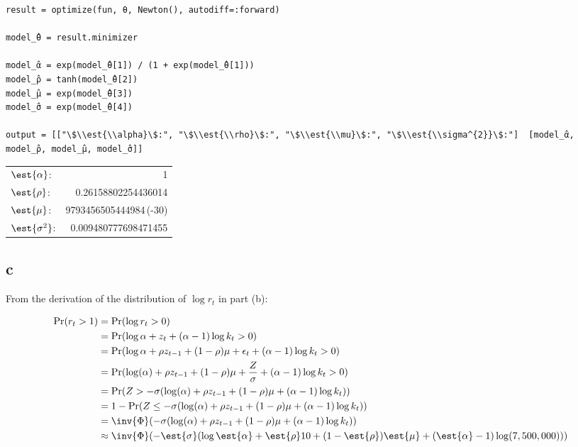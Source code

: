 \documentclass[12pt, letterpaper]{paper}
\begin{document}
\begin{verbatim}
result = optimize(fun, θ, Newton(), autodiff=:forward)

model_̂θ = result.minimizer

model_̂α = exp(model_̂θ[1]) / (1 + exp(model_̂θ[1]))
model_̂ρ = tanh(model_̂θ[2])
model_̂μ = exp(model_̂θ[3])
model_̂σ = exp(model_̂θ[4])

output = [["\$\\est{\\alpha}\$:", "\$\\est{\\rho}\$:", "\$\\est{\\mu}\$:", "\$\\est{\\sigma^{2}}\$:"]  [model_̂α, model_̂ρ, model_̂μ, model_̂σ]]
\end{verbatim}

\begin{center}
\begin{tabular}{lr}
\(\est{\alpha}\): & 1\\
\(\est{\rho}\): & 0.26158802254436014\\
\(\est{\mu}\): & 9793456505444984\,(-30)\\
\(\est{\sigma^{2}}\): & 0.009480777698471455\\
\end{tabular}
\end{center}

\subsection{c}
\label{sec:orge56c897}
From the derivation of the distribution of $\log r_t$ in part (b):

\begin{align*}
    \Pr( r_t > 1) &= \Pr( \log r_t > 0)\\
                  &= \Pr( \log \alpha + z_t + (\alpha - 1)\log k_t > 0)\\
                  &= \Pr( \log \alpha + \rho z_{t-1} + (1 - \rho)\mu + \epsilon_t + (\alpha-1) \log k_t > 0)\\
    &= \Pr( \log(\alpha) + \rho z_{t-1} + (1-\rho)\mu + \frac{Z}{\sigma} + (\alpha-1) \log k_t
      > 0)\\
                  &= \Pr( Z > - \sigma ( \log(\alpha) + \rho z_{t-1} + (1-\rho)\mu + (\alpha-1)\log k_t))\\
    &= 1 - \Pr( Z \leq - \sigma ( \log(\alpha) + \rho z_{t-1} + (1-\rho)\mu + (\alpha-1)\log
      k_t))\\
                  &= \inv{ \Phi}( - \sigma ( \log(\alpha) + \rho z_{t-1} + (1-\rho)\mu + (\alpha-1)\log k_t ))\\
    &\approx \inv{\Phi}( -\est{\sigma} ( \log \est{\alpha} + \est{\rho}10 + (1-\est{\rho})
      \est{\mu} + (\est{\alpha} - 1) \log( 7,500,000) ))\\
  \end{align*}
\end{document}
